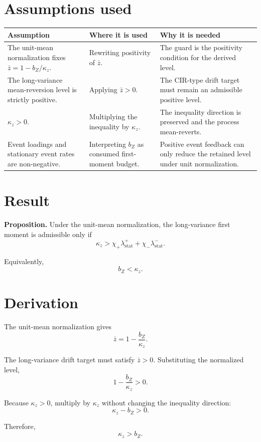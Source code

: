 \documentclass[11pt]{article}
\begin{document}
\section{Assumptions used}

\begin{tabularx}{\textwidth}{XXX}
\toprule
Assumption & Where it is used & Why it is needed\\
\midrule
The unit-mean normalization fixes \(\bar z=1-b_Z/\kappa_z\).
& Rewriting positivity of \(\bar z\).
& The guard is the positivity condition for the derived level.\\
The long-variance mean-reversion level is strictly positive.
& Applying \(\bar z>0\).
& The CIR-type drift target must remain an admissible positive level.\\
\(\kappa_z>0\).
& Multiplying the inequality by \(\kappa_z\).
& The inequality direction is preserved and the process mean-reverts.\\
Event loadings and stationary event rates are non-negative.
& Interpreting \(b_Z\) as consumed first-moment budget.
& Positive event feedback can only reduce the retained level under unit normalization.\\
\bottomrule
\end{tabularx}

\section{Result}

\noindent\textbf{Proposition.} Under the unit-mean normalization, the
long-variance first moment is admissible only if
\[
    \kappa_z
    >
    \chi_+\lambda_{\mathrm{stat}}^+
    +\chi_-\lambda_{\mathrm{stat}}^-.
\]

Equivalently,
\[
    b_Z<\kappa_z.
\]

\section{Derivation}

The unit-mean normalization gives
\[
    \bar z
    =
    1-\frac{b_Z}{\kappa_z}.
\]

The long-variance drift target must satisfy \(\bar z>0\). Substituting the
normalized level,
\[
    1-\frac{b_Z}{\kappa_z}>0.
\]

Because \(\kappa_z>0\), multiply by \(\kappa_z\) without changing the inequality
direction:
\[
    \kappa_z-b_Z>0.
\]

Therefore,
\[
    \kappa_z>b_Z.
\]
\end{document}
